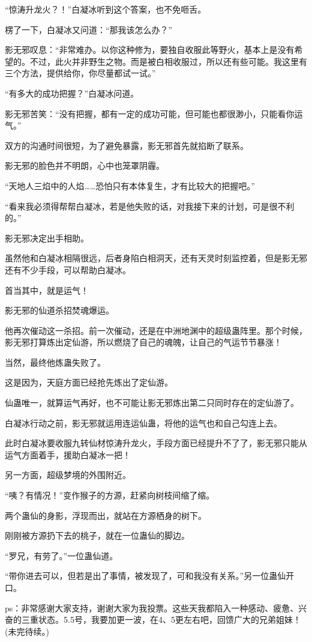 \begin{this_body}
“惊涛升龙火？！”白凝冰听到这个答案，也不免咂舌。

楞了一下，白凝冰又问道：“那我该怎么办？”

影无邪叹息：“非常难办。以你这种修为，要独自收服此等野火，基本上是没有希望的。不过，此火并非野生之物。而是被白相收服过，所以还有些可能。我这里有三个方法，提供给你，你尽量都试一试。”

“有多大的成功把握？”白凝冰问道。

影无邪苦笑：“没有把握，都有一定的成功可能，但可能也都很渺小，只能看你运气。”

双方的沟通时间很短，为了避免暴露，影无邪首先就掐断了联系。

影无邪的脸色并不明朗，心中也笼罩阴霾。

“天地人三焰中的人焰……恐怕只有本体复生，才有比较大的把握吧。”

“看来我必须得帮帮白凝冰，若是他失败的话，对我接下来的计划，可是很不利的。”

影无邪决定出手相助。

虽然他和白凝冰相隔很远，后者身陷白相洞天，还有天灵时刻监控着，但是影无邪还有不少手段，可以帮助白凝冰。

首当其中，就是运气！

影无邪的仙道杀招焚魂爆运。

他再次催动这一杀招。前一次催动，还是在中洲地渊中的超级蛊阵里。那个时候，影无邪打算炼出定仙游，所以燃烧了自己的魂魄，让自己的气运节节暴涨！

当然，最终他炼蛊失败了。

这是因为，天庭方面已经抢先炼出了定仙游。

仙蛊唯一，就算运气再好，也不可能让影无邪炼出第二只同时存在的定仙游了。

白凝冰行动之前，影无邪就运用连运仙蛊，将他的运气也和自己勾连上去。

此时白凝冰要收服九转仙材惊涛升龙火，手段方面已经提升不了了，影无邪只能从运气方面着手，援助白凝冰一把！

另一方面，超级梦境的外围附近。

“咦？有情况！”变作猴子的方源，赶紧向树枝间缩了缩。

两个蛊仙的身影，浮现而出，就站在方源栖身的树下。

刚刚被方源扔下去的桃子，就在一位蛊仙的脚边。

“罗兄，有劳了。”一位蛊仙道。

“带你进去可以，但若是出了事情，被发现了，可和我没有关系。”另一位蛊仙开口。

ps：非常感谢大家支持，谢谢大家为我投票。这些天我都陷入一种感动、疲惫、兴奋的三重状态。5.5号，我要加更一波，在4、5更左右吧，回馈广大的兄弟姐妹！(未完待续。)

\end{this_body}

